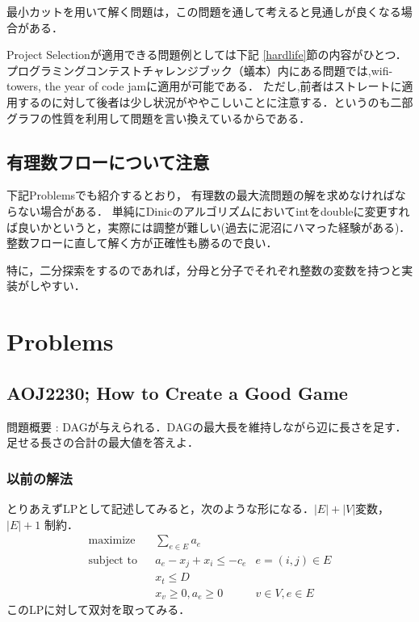 \documentclass[13pt]{jarticle}
\theoremstyle{nonitalic} %
\begin{document}
最小カットを用いて解く問題は，この問題を通して考えると見通しが良くなる場合がある．

Project Selectionが適用できる問題例としては下記 \ref{hardlife}節の内容がひとつ．
プログラミングコンテストチャレンジブック（蟻本）内にある問題では,wifi-towers, the year of code jamに適用が可能である．
ただし,前者はストレートに適用するのに対して後者は少し状況がややこしいことに注意する．というのも二部グラフの性質を利用して問題を言い換えているからである．


\subsection{有理数フローについて注意}

下記Problemsでも紹介するとおり， 有理数の最大流問題の解を求めなければならない場合がある． 単純にDinicのアルゴリズムにおいてintをdoubleに変更すれば良いかというと，実際には調整が難しい(過去に泥沼にハマった経験がある)． 整数フローに直して解く方が正確性も勝るので良い．

特に，二分探索をするのであれば，分母と分子でそれぞれ整数の変数を持つと実装がしやすい．



\section{Problems}

\subsection{AOJ2230; How to Create a Good Game}
\label{aoj2230}

問題概要 : DAGが与えられる．DAGの最大長を維持しながら辺に長さを足す．足せる長さの合計の最大値を答えよ．\\

\subsubsection{以前の解法}
とりあえずLPとして記述してみると，次のような形になる．$|E|+|V|$変数， $|E|+1$ 制約．
\begin{align}
 &&&&&\textrm{maximize}   && \sum_{e \in E} a_e \\
 &&&&&\textrm{subject to} && a_e - x_j + x_i \leq - c_e & e = (i,j) \in E  &&&&&\\
 &&&&&                    && x_t \leq  D &&&&&& \\
 &&&&&                    && x_v \geq 0, a_e \geq 0 & v \in V, e \in E &&&&&
\end{align}
このLPに対して双対を取ってみる．
\end{document}
